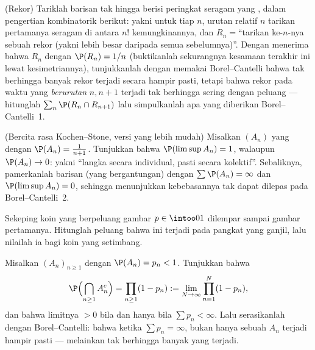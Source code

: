 \begin{exercise}[$\star\star\star$]\label{exo:b2:proba:7}
(Rekor) Tariklah barisan tak hingga berisi peringkat seragam yang , dalam pengertian kombinatorik berikut: yakni untuk tiap $n$,
urutan relatif $n$ tarikan pertamanya seragam di antara $n!$
kemungkinannya, dan $R_n = {}$``tarikan ke-$n$-nya sebuah rekor (yakni lebih besar
daripada semua sebelumnya)''. Dengan menerima bahwa  $R_n$  dengan $\P(R_n) = 1/n$ (buktikanlah sekurangnya kesamaan terakhir
ini lewat kesimetriannya), tunjukkanlah dengan memakai Borel--Cantelli bahwa tak berhingga
banyak rekor terjadi secara hampir pasti, tetapi bahwa rekor pada waktu
yang \emph{berurutan} $n, n+1$ terjadi tak berhingga sering dengan
peluang --- hitunglah $\sum_n \P(R_n \cap R_{n+1})$ lalu
simpulkanlah apa yang diberikan Borel--Cantelli~1.
\end{exercise}

\begin{exercise}[$\star\star\star$]\label{exo:b2:proba:8}
(Bercita rasa Kochen--Stone, versi yang lebih mudah) Misalkan $(A_n)$ 
yang  dengan $\P(A_n) = \frac{1}{n+1}$. Tunjukkan bahwa
$\P(\limsup A_n) = 1$, walaupun $\P(A_n) \to 0$: yakni ``langka
secara individual, pasti secara kolektif''. Sebaliknya, pamerkanlah barisan
 (yang bergantungan) dengan $\sum\P(A_n) = \infty$ dan
$\P(\limsup A_n) = 0$, sehingga menunjukkan kebebasannya tak dapat dilepas pada
Borel--Cantelli~2.
\end{exercise}

\begin{exercise}[$\star$]\label{exo:b2:proba:9}
Sekeping koin yang berpeluang gambar $p \in \intoo01$ dilempar sampai
gambar pertamanya. Hitunglah peluang bahwa ini terjadi pada
pangkat yang ganjil, lalu nilailah ia bagi koin yang setimbang.
\end{exercise}

\begin{exercise}[$\star\star$]\label{exo:b2:proba:10}
Misalkan $(A_n)_{n\geq1}$  dengan $\P(A_n) =
p_n < 1$. Tunjukkan bahwa
\[
\P\Bigl(\bigcap_{n\geq1}A_n^c\Bigr)
= \prod_{n\geq1}(1 - p_n)
:= \lim_{N\to\infty}\prod_{n=1}^N(1 - p_n),
\]
dan bahwa limitnya $> 0$ bila dan hanya bila $\sum p_n <
\infty$. Lalu serasikanlah dengan Borel--Cantelli: bahwa ketika $\sum p_n =
\infty$, bukan hanya sebuah $A_n$ terjadi hampir pasti ---
melainkan tak berhingga banyak yang terjadi.
\end{exercise}


